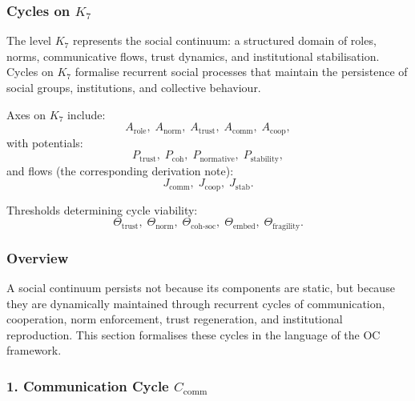 
\subsubsection{Cycles on \texorpdfstring{$K_7$}{K_7}}
\label{sec:cycles-k7}

The level $K_7$ represents the social continuum: a structured domain of
roles, norms, communicative flows, trust dynamics, and institutional
stabilisation.
Cycles on $K_7$ formalise recurrent social processes that maintain the
persistence of social groups, institutions, and collective behaviour.

Axes on $K_7$ include:
\[
  A_{\mathrm{role}},\;
  A_{\mathrm{norm}},\;
  A_{\mathrm{trust}},\;
  A_{\mathrm{comm}},\;
  A_{\mathrm{coop}},
\]
with potentials:
\[
  P_{\mathrm{trust}},\;
  P_{\mathrm{coh}},\;
  P_{\mathrm{normative}},\;
  P_{\mathrm{stability}},
\]
and flows (the corresponding derivation note):
\[
  J_{\mathrm{comm}},\;
  J_{\mathrm{coop}},\;
  J_{\mathrm{stab}}.
\]

Thresholds determining cycle viability:
\[
  \Theta_{\mathrm{trust}},\;
  \Theta_{\mathrm{norm}},\;
  \Theta_{\mathrm{coh\text{-}soc}},\;
  \Theta_{\mathrm{embed}},\;
  \Theta_{\mathrm{fragility}}.
\]

\subsubsection{Overview}

A social continuum persists not because its components are static, but because
they are dynamically maintained through recurrent cycles of communication,
cooperation, norm enforcement, trust regeneration, and institutional
reproduction.
This section formalises these cycles in the language of the OC framework.

\subsubsection{1. Communication Cycle $C_{\mathrm{comm}}$}

